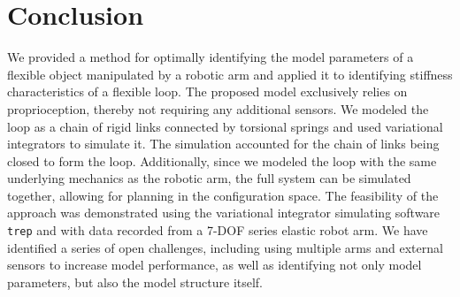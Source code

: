 \documentclass[letterpaper, 10pt, conference]{ieeeconf}
\begin{document}
\section{Conclusion}
We provided a method for optimally identifying the model parameters of a flexible object manipulated by a robotic arm and applied it to identifying stiffness characteristics of a flexible loop. The proposed model exclusively relies on proprioception, thereby not requiring any additional sensors. We modeled the loop as a chain of rigid links connected by torsional springs and used variational integrators to simulate it.  The simulation accounted for the chain of links being closed to form the loop. Additionally, since we modeled the loop with the same underlying mechanics as the robotic arm, the full system can be simulated together, allowing for planning in the configuration space.  The feasibility of the approach was demonstrated using the variational integrator simulating software \texttt{trep} and with data recorded from a 7-DOF series elastic robot arm. We have identified a series of open challenges, including using multiple arms and external sensors to increase model performance, as well as identifying not only model parameters, but also the model structure itself. 



\end{document}
